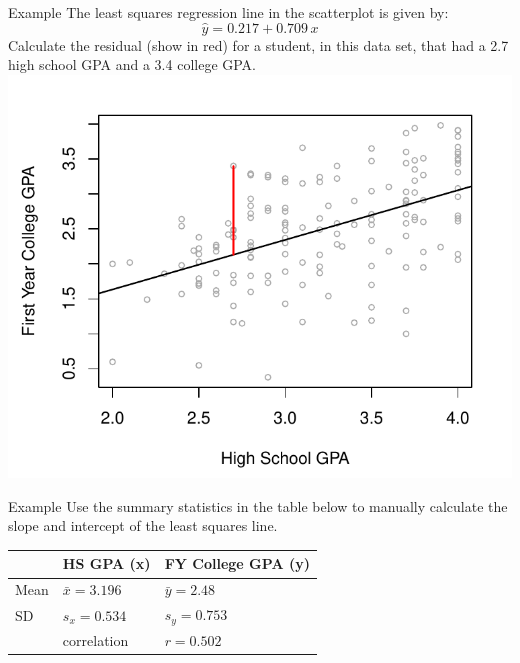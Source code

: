\documentclass[11pt, fleqn]{beamer}\usepackage[]{graphicx}\usepackage[]{color}
\begin{document}
\begin{frame}{Example}
\vspace{-0.5cm}
The least squares regression line in the scatterplot is given by:
$$\hat{y} = 0.217 + 0.709\,x$$
Calculate the residual (show in red) for a student, in this data set, that had a 2.7 high school GPA and a 3.4 college GPA.
\includegraphics[scale=0.4]{figure/gpa_scatter_resid.pdf}
\end{frame}

\begin{frame}{Example}
Use the summary statistics in the table below to manually calculate the slope and intercept of the least squares line.\\

\begin{table}
\begin{tabular}{lll}
\hline
 & HS GPA (x) & FY College GPA (y)\\
\hline
Mean & $\bar{x} = 3.196$ & $\bar{y}=2.48$\\
SD & $s_x = 0.534$ & $s_y=0.753$\\
\hline
& correlation & $r=0.502$\\
\hline
\end{tabular}
\end{table}

\vspace{3.5cm}
\end{frame}
\end{document}

